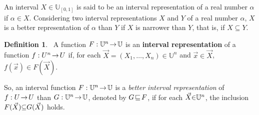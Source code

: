 \documentclass[conference]{IEEEtran}
\theoremstyle{plain}
\theoremstyle{remark}
\theoremstyle{definition}
\newtheorem{definition}[theorem]{Definition}
\theoremstyle{proposition}
\newcommand{\lra}{\hspace{-0.05cm}\rightarrow\hspace{-0.05cm}}
\newcommand{\UU}{\mathbb{U} }
\begin{document}
An interval $X \in \UU_{[0,1]}$ is said to be an interval representation of a real number $\alpha$ if $\alpha \in X$.
Considering two interval representations $X$ and $Y$ of a real number $\alpha$,  $X$ is a better representation of
$\alpha$ than $Y$ if $X$ is narrower than $Y$, that is,  if $X\subseteq Y$.

\begin{definition}~\cite[Section 1]{SBA06}\label{d1} A function $F:{\mathbb{U}}^n\lra \mathbb{U}$ is an \textbf{interval
representation} of a function $f:U^n\lra U$ if, for each
$\vec{X}= (X_1, \ldots, X_n)\in {\mathbb{U}}^n$ and $\vec{x}\in \vec{X}$, $f(\vec{x})\in
F(\vec{X})$.
\end{definition}


So, an interval function $F:{\mathbb{U}}^n\lra \mathbb{U}$ is a \emph{better
interval representation} of $f:U\lra U$ than $G:{\mathbb{U}}^n\lra \mathbb{U}$, denoted by $G\hspace{-0.05cm}\sqsubseteq\hspace{-0.05cm}
F$, if for each $\vec{X}\hspace{-0.1cm}\in\hspace{-0.1cm}{\mathbb{U}}^n$, the inclusion $F(\vec{X})\hspace{-0.1cm}\subseteq\hspace{-0.1cm}G(\vec{X})$ holds.

\end{document}
